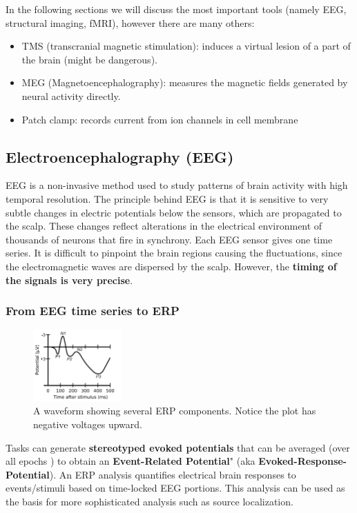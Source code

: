 In the following sections we will discuss the most important tools (namely EEG, structural imaging, fMRI), however there are many others:
\begin{itemize}
    \item TMS (transcranial magnetic stimulation): induces a virtual lesion of a part of the brain (might be dangerous).
    \item MEG (Magnetoencephalography): measures the magnetic fields generated by neural activity directly.
    \item Patch clamp: records current from ion channels in cell membrane
\end{itemize}

\subsection{Electroencephalography (EEG)}
EEG is a non-invasive method used to study patterns of brain activity with high temporal resolution.
The principle behind EEG is that it is sensitive to very subtle changes in electric potentials below the sensors, which are propagated to the scalp. These changes reflect alterations in the electrical environment of thousands of neurons that fire in synchrony. Each EEG sensor gives one time series.
It is difficult to pinpoint the brain regions causing the fluctuations, since the electromagnetic waves are dispersed by the scalp. However, the \textbf{timing of the signals is very precise}.

\subsubsection{From EEG time series to ERP}
\begin{figure}
  \centering \includegraphics[width=0.3\textwidth]{images/ComponentsofERP.png}
  \caption*{A waveform showing several ERP components. Notice the plot has negative voltages upward.}
\end{figure}

Tasks can generate \textbf{stereotyped evoked potentials} that can be averaged (over all epochs \notet) to obtain an \textbf{Event-Related Potential}" (aka \textbf{Evoked-Response-Potential}). An ERP analysis quantifies electrical brain responses to events/stimuli based on time-locked EEG portions. This analysis can be used as the basis for more sophisticated analysis such as source localization.

